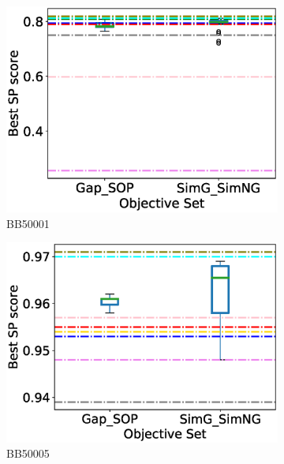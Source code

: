 \begin{figure}[!htbp]
\begin{adjustwidth}{-1cm}{-1cm}
		\begin{subfigure}{0.22\textwidth}
			\includegraphics[width=\columnwidth]{Figure/summary/precomputedInit/Balibase/BB50001_objset_pairs_rank_2}
			\caption{BB50001}
		\end{subfigure}	
		\begin{subfigure}{0.22\textwidth}
			\includegraphics[width=\columnwidth]{Figure/summary/precomputedInit/Balibase/BB50005_objset_pairs_rank_2}
			\caption{BB50005}
		\end{subfigure}
		\begin{subfigure}{0.22\textwidth}

\end{subfigure}
\end{adjustwidth}
\end{figure}
